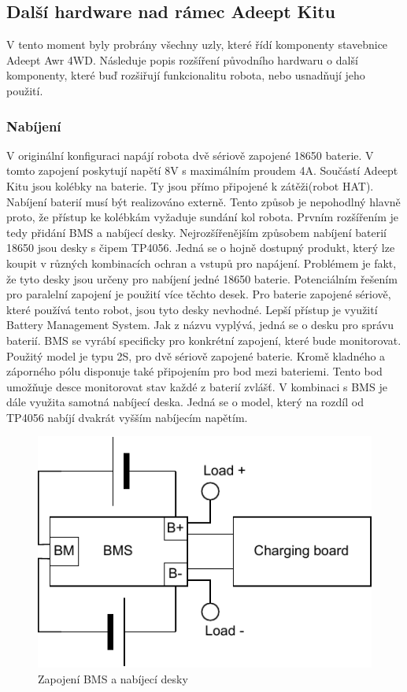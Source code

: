 \subsection*{Další hardware nad rámec Adeept Kitu}
V tento moment byly probrány všechny uzly, které řídí komponenty stavebnice Adeept Awr 4WD. Následuje popis rozšíření původního hardwaru o další komponenty, které buď rozšiřují funkcionalitu robota, nebo usnadňují jeho použití.

\subsubsection*{Nabíjení}
V originální konfiguraci napájí robota dvě sériově zapojené 18650 baterie. V tomto zapojení poskytují napětí 8V s maximálním proudem 4A. Součástí Adeept Kitu jsou kolébky na baterie. Ty jsou přímo připojené k zátěži(robot HAT). Nabíjení baterií musí být realizováno externě. Tento způsob je nepohodlný hlavně proto, že přístup ke kolébkám vyžaduje sundání kol robota. Prvním rozšířením je tedy přidání BMS a nabíjecí desky. 
Nejrozšířenějším způsobem nabíjení baterií 18650 jsou desky s čipem TP4056. Jedná se o hojně dostupný produkt, který lze koupit v různých kombinacích ochran a vstupů pro napájení. Problémem je fakt, že tyto desky jsou určeny pro nabíjení jedné 18650 baterie. Potenciálním řešením pro paralelní zapojení je použití více těchto desek. Pro baterie zapojené sériově, které používá tento robot, jsou tyto desky nevhodné.
Lepší přístup je využití Battery Management System. Jak z názvu vyplývá, jedná se o desku pro správu baterií. BMS se vyrábí specificky pro konkrétní zapojení, které bude monitorovat. Použitý model je typu 2S, pro dvě sériově zapojené baterie. Kromě kladného a záporného pólu disponuje také připojením pro bod mezi bateriemi. Tento bod umožňuje desce monitorovat stav každé z baterií zvlášť.
V kombinaci s BMS je dále využita samotná nabíjecí deska. Jedná se o model, který na rozdíl od TP4056 nabíjí dvakrát vyšším nabíjecím napětím.

\begin{figure}[h!]
	\centering
	\includegraphics[scale=0.75]{obrazky-figures/battery_circuite.pdf}
	\caption{Zapojení BMS a nabíjecí desky}
	\label{}
\end{figure}

